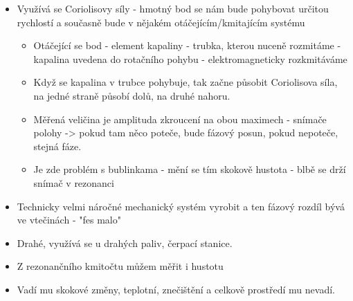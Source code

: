 \begin{itemize}
    \item Využívá se Coriolisovy síly - hmotný bod se nám bude pohybovat určitou rychlostí a současně bude v nějakém otáčejícím/kmitajícím systému \begin{itemize}
              \item Otáčející se bod - element kapaliny - trubka, kterou nuceně rozmitáme - kapalina uvedena do rotačního pohybu - elektromagneticky rozkmitáváme
              \item Když se kapalina v trubce pohybuje, tak začne působit Coriolisova síla, na jedné straně působí dolů, na druhé nahoru.
              \item Měřená veličina je amplituda zkroucení na obou maximech - snímače polohy -> pokud tam něco poteče, bude fázový posun, pokud nepoteče, stejná fáze.
              \item Je zde problém s bublinkama - mění se tím skokově hustota - blbě se drží snímač v rezonanci
          \end{itemize}
    \item Technicky velmi náročné mechanický systém vyrobit a ten fázový rozdíl bývá ve vtečinách - "fes malo"
    \item Drahé, využívá se u drahých paliv, čerpací stanice.
    \item Z rezonančního kmitočtu můžem měřit i hustotu
    \item Vadí mu skokové změny, teplotní, znečištění a celkově prostředí mu nevadí.
\end{itemize}

